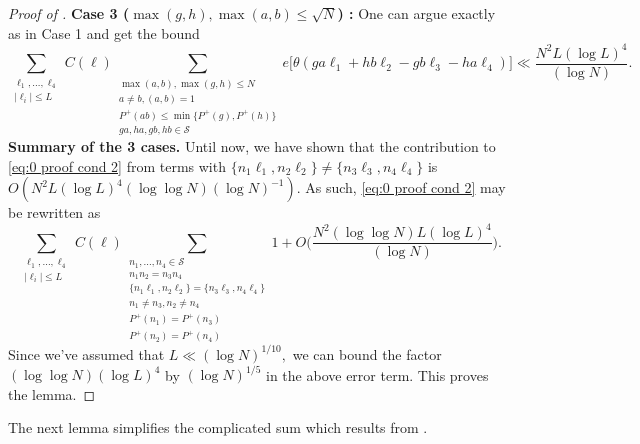 \documentclass[12pt]{amsart}
\renewcommand{\leq}{\leqslant}
\numberwithin{equation}{section}
\theoremstyle{plain}
\theoremstyle{definition}
\renewcommand{\l}{\ell}
\newcommand{\CS}{\mathcal{S}}
\begin{document}
\begin{proof}[Proof of ]
		\textbf{Case 3 ($\max(g,h),\max(a,b) \leq \sqrt{N}$) : }One can argue exactly as in Case 1 and get the bound
		\begin{equation*}
			\sum_{\substack{\l_1,\dots,\l_4 \\ |\l_i| \leq L}} C(\bm{\l}) \sum_{\substack{\max(a,b) , \max(g,h) \leq N \\ a \ne b, (a,b) = 1 \\ P^+(ab) \leq \min\{P^+(g),P^+(h)\} \\ ga,ha,gb,hb \in \CS}} e\Big[\theta (ga\l_1+hb\l_2-gb\l_3-ha\l_4)\Big] \ll \frac{N^2 L (\log L)^4}{(\log N)}.
		\end{equation*}
		\textbf{Summary of the 3 cases.}
		Until now, we have shown that the contribution to \eqref{eq:0 proof cond 2} from terms with $\{n_1\l_1,n_2\l_2\} \ne \{n_3\l_3,n_4\l_4\}$ is  $O(N^2 L (\log L)^4 (\log \log N) (\log N)^{-1})$. As such, \eqref{eq:0 proof cond 2} may be rewritten as 
		\begin{equation*}
			\sum_{\substack{\l_1,\dots,\l_4 \\ |\l_i| \leq L}} C(\bm{\l}) \sum_{\substack{n_1,\dots,n_4 \in \CS \\ n_1n_2=n_3n_4 \\ \{n_1\l_1,n_2\l_2\}=\{n_3\l_3,n_4\l_4\} \\ n_1 \ne n_3,n_2 \ne n_4 \\ P^+(n_1)=P^+(n_3) \\ P^+(n_2) = P^+(n_4) }} 1 + O\bigg(\frac{N^2 (\log \log N) L (\log L)^4}{(\log N)}\bigg).
		\end{equation*}
		Since we've assumed that $L \ll (\log N)^{1/10},$ we can bound the factor $(\log \log N) (\log L)^4$ by $(\log N)^{1/5}$ in the above error term. This proves the lemma.
	\end{proof}
	The next lemma simplifies the complicated sum which results from .
	
\end{document}

